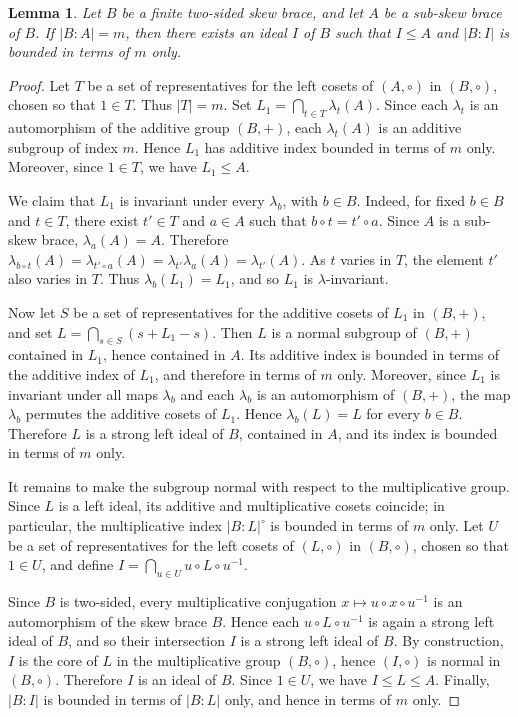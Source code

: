 \documentclass[10pt,a4paper]{amsart}
\numberwithin{equation}{section}
\newtheorem{lem}[equation]{Lemma}
\begin{document}
\begin{lem}\label{lem:finite-index-ideal-core-two-sided}
Let $B$ be a finite two-sided skew brace, and let $A$ be a sub-skew brace of $B$.
If $|B:A|=m$, then there exists an ideal $I$ of $B$ such that $I\leqslant A$ and
$|B:I|$ is bounded in terms of $m$ only.
\end{lem}

\begin{proof}
Let $T$ be a set of representatives for the left cosets of $(A,\circ)$ in
$(B,\circ)$, chosen so that $1\in T$. Thus $|T|=m$. Set
$L_1=\bigcap_{t\in T}\lambda_t(A)$. Since each $\lambda_t$ is an automorphism
of the additive group $(B,+)$, each $\lambda_t(A)$ is an additive subgroup of
index $m$. Hence $L_1$ has additive index bounded in terms of $m$ only.
Moreover, since $1\in T$, we have $L_1\leqslant A$.

We claim that $L_1$ is invariant under every $\lambda_b$, with $b\in B$. Indeed,
for fixed $b\in B$ and $t\in T$, there exist $t'\in T$ and $a\in A$ such that
$b\circ t=t'\circ a$. Since $A$ is a sub-skew brace, $\lambda_a(A)=A$. Therefore
$\lambda_{b\circ t}(A)=\lambda_{t'\circ a}(A)=\lambda_{t'}\lambda_a(A)
=\lambda_{t'}(A)$. As $t$ varies in $T$, the element $t'$ also varies in $T$.
Thus $\lambda_b(L_1)=L_1$, and so $L_1$ is $\lambda$-invariant.

Now let $S$ be a set of representatives for the additive cosets of $L_1$ in
$(B,+)$, and set $L=\bigcap_{s\in S}(s+L_1-s)$. Then $L$ is a normal subgroup
of $(B,+)$ contained in $L_1$, hence contained in $A$. Its additive index is
bounded in terms of the additive index of $L_1$, and therefore in terms of $m$
only. Moreover, since $L_1$ is invariant under all maps $\lambda_b$ and each
$\lambda_b$ is an automorphism of $(B,+)$, the map $\lambda_b$ permutes the
additive cosets of $L_1$. Hence $\lambda_b(L)=L$ for every $b\in B$. Therefore
$L$ is a strong left ideal of $B$, contained in $A$, and its index is bounded
in terms of $m$ only.

It remains to make the subgroup normal with respect to the multiplicative
group. Since $L$ is a left ideal, its additive and multiplicative cosets
coincide; in particular, the multiplicative index $|B:L|^{\circ}$ is bounded
in terms of $m$ only. Let $U$ be a set of representatives for the left cosets
of $(L,\circ)$ in $(B,\circ)$, chosen so that $1\in U$, and define
$I=\bigcap_{u\in U}u\circ L\circ u^{-1}$.

Since $B$ is two-sided, every multiplicative conjugation $x\mapsto u\circ x
\circ u^{-1}$ is an automorphism of the skew brace $B$. Hence each
$u\circ L\circ u^{-1}$ is again a strong left ideal of $B$, and so their
intersection $I$ is a strong left ideal of $B$. By construction, $I$ is the
core of $L$ in the multiplicative group $(B,\circ)$, hence $(I,\circ)$ is
normal in $(B,\circ)$. Therefore $I$ is an ideal of $B$. Since $1\in U$, we
have $I\leqslant L\leqslant A$. Finally, $|B:I|$ is bounded in terms of $|B:L|$ only,
and hence in terms of $m$ only.
\end{proof}
\end{document}
